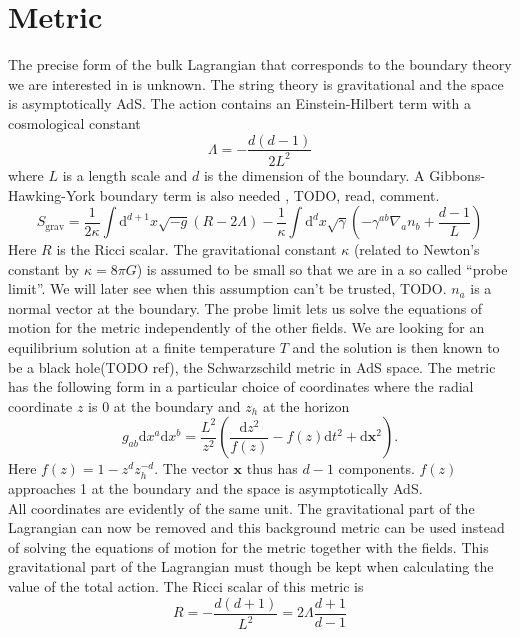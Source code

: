 \documentclass[12pt]{report}
\renewcommand{\d}{\ensuremath{\mathrm{d}}}
\begin{document}
\section{Metric}
The precise form of the bulk Lagrangian that corresponds to the boundary theory we are interested in is unknown. The string theory is gravitational and the space is asymptotically AdS. The action contains an Einstein-Hilbert term with a cosmological constant
\begin{equation}
\Lambda=-\frac{d(d-1)}{2L^2}
\end{equation}
where $L$ is a length scale and $d$ is the dimension of the boundary.
A Gibbons-Hawking-York boundary term is also needed \cite{PhysRevD.15.2752}, \cite{PhysRevLett.28.1082} TODO, read, comment.
\begin{equation}
 S_{\mathrm{grav}}=\frac{1}{2\kappa}\int \d^{d+1}x\sqrt{-g}\left(R-2\Lambda\right)-\frac{1}{\kappa}\int \d^dx\sqrt{\gamma}\left(-\gamma^{ab}\nabla_an_b+\frac{d-1}{L}\right)
\end{equation}
Here $R$ is the Ricci scalar. The gravitational constant $\kappa$ (related to Newton's constant by $\kappa=8\pi G$) is assumed to be small so that we are in a so called ``probe limit''. We will later see when this assumption can't be trusted, TODO. $n_a$ is a normal vector at the boundary. The probe limit lets us solve the equations of motion for the metric independently of the other fields. We are looking for an equilibrium solution at a finite temperature $T$ and the solution is then known to be a black hole(TODO ref), the Schwarzschild metric in AdS space. The metric has the following form in a particular choice of coordinates where the radial coordinate $z$ is 0 at the boundary and $z_h$ at the horizon
\begin{equation}
 g_{ab}\d x^a\d x^b=\frac{L^2}{z^2}\left(\frac{\d z^2}{f(z)}-f(z)\d t^2+\d \mathbf{x}^2\right).\label{metric}
\end{equation}
Here $f(z)=1-z^dz_h^{-d}$. The vector $\mathbf{x}$ thus has $d-1$ components. $f(z)$ approaches 1 at the boundary and the space is asymptotically AdS.\\
All coordinates are evidently of the same unit. The gravitational part of the Lagrangian can now be removed and this background metric can be used instead of solving the equations of motion for the metric together with the fields. This gravitational part of the Lagrangian must though be kept when calculating the value of the total action. The Ricci scalar of this metric is
\begin{equation}
 R=-\frac{d(d+1)}{L^2}=2\Lambda\frac{d+1}{d-1}
\end{equation}
\end{document}
